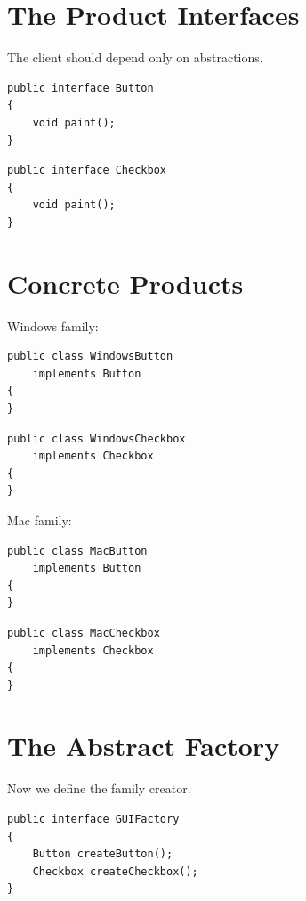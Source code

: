 \documentclass[11pt,a4paper]{book}
\begin{document}

\section{The Product Interfaces}

The client should depend only on abstractions.

\begin{verbatim}
public interface Button
{
    void paint();
}
\end{verbatim}

\begin{verbatim}
public interface Checkbox
{
    void paint();
}
\end{verbatim}


\section{Concrete Products}

Windows family:

\begin{verbatim}
public class WindowsButton
    implements Button
{
}
\end{verbatim}

\begin{verbatim}
public class WindowsCheckbox
    implements Checkbox
{
}
\end{verbatim}

Mac family:

\begin{verbatim}
public class MacButton
    implements Button
{
}
\end{verbatim}

\begin{verbatim}
public class MacCheckbox
    implements Checkbox
{
}
\end{verbatim}


\section{The Abstract Factory}

Now we define the family creator.

\begin{verbatim}
public interface GUIFactory
{
    Button createButton();
    Checkbox createCheckbox();
}
\end{verbatim}
\end{document}
